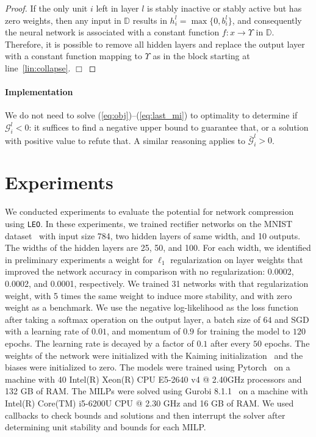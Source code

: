 \documentclass[runningheads]{llncs}
\def\sD{{\mathbb{D}}}
\begin{document}
\begin{proof}
        If the only unit $i$ left in layer $l$ is stably inactive or stably active but has zero weights, then any input in $\sD$ results in $h_i^l = \max\{0,b_i^l\}$, 
        and consequently the neural network is associated with a constant function $f : x \rightarrow \Upsilon$ in $\sD$. Therefore, it is possible to remove all hidden layers and replace 
the output layer with a constant function mapping to $\Upsilon$ as in the block starting at line~\ref{lin:collapse}. $\Box$
    \end{proof}
    
    \paragraph{Implementation} We do not need to solve (\ref{eq:obj})--(\ref{eq:last_mi}) to optimality to determine if $\mathcal{G}_i^l < 0$: it suffices to find a negative upper bound to guarantee that, or a solution with positive value to refute that. A similar reasoning applies to $\bar{\mathcal{G}}_i^l > 0$.



%
 
\pagebreak

\section{Experiments}
    We conducted experiments to evaluate the potential for network compression using \texttt{LEO}. 
    In these experiments, 
    we trained rectifier networks on the MNIST dataset~\cite{LeCun1998} with input size 784, two hidden layers of same width, and 10 outputs. 
    The widths of the hidden layers are 25, 50, and 100. 
    For each width, we identified in preliminary experiments a weight for $\ell_1$ regularization on layer weights that improved the network accuracy in comparison with no regularization: 0.0002, 0.0002, and 0.0001, respectively. 
    We trained 31 networks with that  regularization weight, with 5 times the same weight to induce more stability, and with zero weight as a benchmark. 
    We use the negative log-likelihood as the loss function after taking a softmax operation on the output layer, 
a batch size of $64$ and SGD with a learning rate of $0.01$, and momentum of $0.9$ for training the model to $120$ epochs. The learning rate is decayed by a factor of $0.1$ after every $50$ epochs. The weights of the network were initialized with the Kaiming initialization~\cite{He2016DeepRL} and the biases were initialized to zero. The models were trained using  Pytorch~\cite{paszke2017automatic} 
    on a machine with 40 Intel(R) Xeon(R) CPU E5-2640 v4 @ 2.40GHz processors and 132 GB of RAM.  
The MILPs were solved 
    using Gurobi 8.1.1~\cite{gurobi} on a machine with Intel(R) Core(TM) i5-6200U CPU @ 2.30 GHz and 16 GB of RAM. We used callbacks to check bounds and solutions and then interrupt the solver after determining unit stability and bounds for each MILP. 
\end{document}
